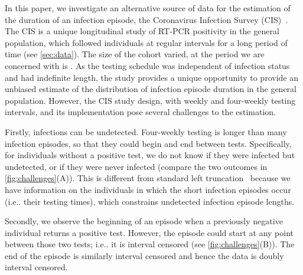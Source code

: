 \documentclass[12pt]{article}
\makeatletter
\DeclareRobustCommand\onedot{\futurelet\@let@token\@onedot}
\def\@onedot{\ifx\@let@token.\else.\null\fi\xspace}
\def\ie{i.e\onedot} \def\Ie{{I.e}\onedot}
\makeatother
\begin{document}
In this paper, we investigate an alternative source of data for the estimation of the duration of an infection episode, the Coronavirus Infection Survey (CIS)~\citep{CIS}.
The CIS is a unique longitudinal study of RT-PCR positivity in the general population, which followed individuals at regular intervals for a long period of time (see \cref{sec:data}).
The size of the cohort varied, at the period we are concerned with is .
As the testing schedule was independent of infection status and had indefinite length, the study provides a unique opportunity to provide an unbiased estimate of the distribution of infection episode duration in the general population.
However, the CIS study design, with weekly and four-weekly testing intervals, and its implementation pose several challenges to the estimation.

Firstly, infections can be undetected.
Four-weekly testing is longer than many infection episodes, so that they could begin and end between tests.
Specifically, for individuals without a positive test, we do not know if they were infected but undetected, or if they were never infected (compare the two outcomes in \cref{fig:challenges}(A)).
This is different from standard left truncation~\cite[e.g.][]{sunEmpirical,bacchettiNonparametric} because we have information on the individuals in which the short infection episodes occur (\ie their testing times), which constrains undetected infection episode lengths.

Secondly, we observe the beginning of an episode when a previously negative individual returns a positive test.
However, the episode could start at any point between those two tests; \ie it is interval censored (see \cref{fig:challenges}(B)).
The end of the episode is similarly interval censored and hence the data is doubly interval censored.
\end{document}
